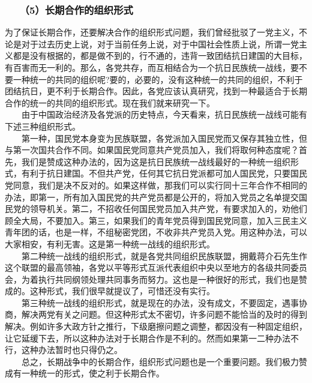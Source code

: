 \documentclass[cn,11pt,chinese]{elegantbook}
\def\myformat#1{\hfil\hfil #1}
\begin{document}
\subsubsection*{\myformat{　　（5）长期合作的组织形式}}
为了保证长期合作，还要解决合作的组织形式问题，我们曾经批驳了一党主义，不论是对于过去历史上说，对于当前任务上说，对于中国社会性质上说，所谓一党主义都是没有根据的，都是做不到的，行不通的，违背一致团结抗日建国的大目标，有百害而无一利的。那么，各党共存，而互相结合为一个抗日民族统一战线，要不要一种统一的共同的组织呢?要的，必要的，没有这种统一的共同的组织，不利于团结抗日，更不利于长期合作。因此，各党应该认真研究，找到一种最适合于长期合作的统一的共同的组织形式。现在我们就来研究一下。\\
　　由于中国政治经济及各党派的历史特点，今天看来，抗日民族统一战线可能有下述三种组织形式。\\
　　第一种，国民党本身变为民族联盟，各党派加入国民党而又保存其独立性，但与第一次国共合作不同。如果国民党同意共产党员加入，我们将取何种态度呢？首先，我们是赞成这种办法的，因为这是抗日民族统一战线最好的一种统一组织形式，有利于抗日建国。不但共产党，任何其它抗日党派都可加人国民党，只要国民党同意，我们是决不反对的。如果这样做，那我们可以实行同十三年合作不相同的办法，即第一，所有加入国民党的共产党员都是公开的，将加入党员之名单提交国民党的领导机关。第二，不招收任何国民党员加入共产党，有要求加入的，劝他们顾全大局，不要加入。第三，如果我们的青年党员得到国民党同意，加入三民主义青年团的话，也是一样，不组秘密党团，不收非共产党员入党。用这种办法，可以大家相安，有利无害。这是第一种统一战线的组织形式。\\
　　第二种统一战线的组织形式，就是各党共同组织民族联盟，拥戴蒋介石先生作这个联盟的最高领袖，各党以平等形式互派代表组织中央以至地方的各级共同委员会，为着执行共同纲领处理共同事务而努力。这也是一种很好的形式，我们也是赞成的。这种形式，我们很早就提议了，可惜还没有实行。\\
　　第三种统一战线的组织形式，就是现在的办法，没有成文，不要固定，遇事协商，解决两党有关之问题。但这种形式太不密切，许多问题不能恰当的及时的得到解决。例如许多大政方针之推行，下级磨擦问题之调整，都因没有一种固定组织，让它延缓下去，所以这种办法对于长期合作是不利的。然而如果第一二种办法不行，这种办法暂时也只得仍之。\\
　　总之，长期战争中的长期合作，组织形式问题也是一个重要问题。我们极力赞成有一种统一的形式，使之利于长期合作。\\
\end{document}
